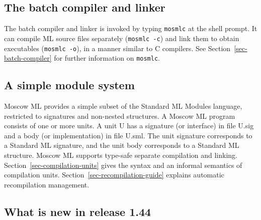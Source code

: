 \documentclass[fleqn]{article}
\begin{document}
\subsection{The batch compiler and linker}

The batch compiler and linker is invoked by typing {\tt mosmlc} at the
shell prompt.  It can compile ML source files separately ({\tt mosmlc
  -c}) and link them to obtain executables ({\tt mosmlc -o}), in a
manner similar to C compilers.  See Section~\ref{sec-batch-compiler}
for further information on {\tt mosmlc}.


\subsection{A simple module system}

Moscow ML provides a simple subset of the Standard ML Modules
language, restricted to signatures and non-nested structures.  A
Moscow ML program consists of one or more units.  A unit U has a
signature (or interface) in file U.sig and a body (or implementation)
in file U.sml.  The unit signature corresponds to a Standard ML
signature, and the unit body corresponds to a Standard ML structure.
Moscow ML supports type-safe separate compilation and linking.
Section~\ref{sec-compilation-units} gives the syntax and an informal
semantics of compilation units.  Section~\ref{sec-recompilation-guide}
explains automatic recompilation management.


\subsection{What is new in release 1.44}
\end{document}
